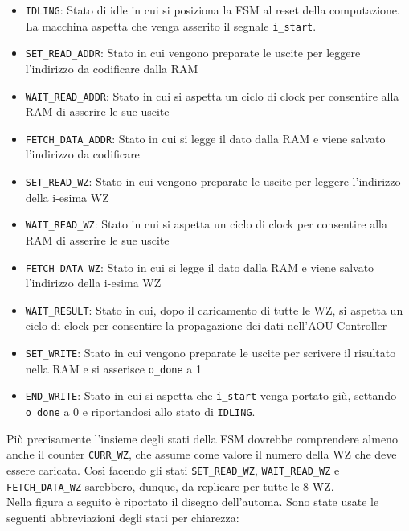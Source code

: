 \documentclass{article}
\begin{document}
\begin{itemize}
\item \texttt{IDLING}: Stato di idle in cui si posiziona la FSM al reset della computazione. La macchina aspetta che venga asserito il segnale \texttt{i\_start}.
\item \texttt{SET\_READ\_ADDR}: Stato in cui vengono preparate le uscite per leggere l'indirizzo da codificare dalla RAM
\item \texttt{WAIT\_READ\_ADDR}: Stato in cui si aspetta un ciclo di clock per consentire alla RAM di asserire le sue uscite
\item \texttt{FETCH\_DATA\_ADDR}: Stato in cui si legge il dato dalla RAM e viene salvato l'indirizzo da codificare
\item \texttt{SET\_READ\_WZ}: Stato in cui vengono preparate le uscite per leggere l'indirizzo della i-esima WZ
\item \texttt{WAIT\_READ\_WZ}: Stato in cui si aspetta un ciclo di clock per consentire alla RAM di asserire le sue uscite 
\item \texttt{FETCH\_DATA\_WZ}: Stato in cui si legge il dato dalla RAM e viene salvato l'indirizzo della i-esima WZ
\item \texttt{WAIT\_RESULT}: Stato in cui, dopo il caricamento di tutte le WZ, si aspetta un ciclo di clock per consentire la propagazione dei dati nell'AOU Controller
\item \texttt{SET\_WRITE}: Stato in cui vengono preparate le uscite per scrivere il risultato nella RAM e si asserisce \texttt{o\_done} a 1
\item \texttt{END\_WRITE}: Stato in cui si aspetta che \texttt{i\_start} venga portato giù, settando \texttt{o\_done} a 0 e riportandosi allo stato di \texttt{IDLING}.
\end{itemize}

Più precisamente l'insieme degli stati della FSM dovrebbe comprendere almeno anche il counter \texttt{CURR\_WZ}, che assume come valore il numero della WZ che deve essere caricata.
Così facendo gli stati \texttt{SET\_READ\_WZ}, \texttt{WAIT\_READ\_WZ} e \texttt{FETCH\_DATA\_WZ} sarebbero, dunque, da replicare per tutte le 8 WZ.\\

Nella figura a seguito è riportato il disegno dell'automa. Sono state usate le seguenti abbreviazioni degli stati per chiarezza:\\
\end{document}
